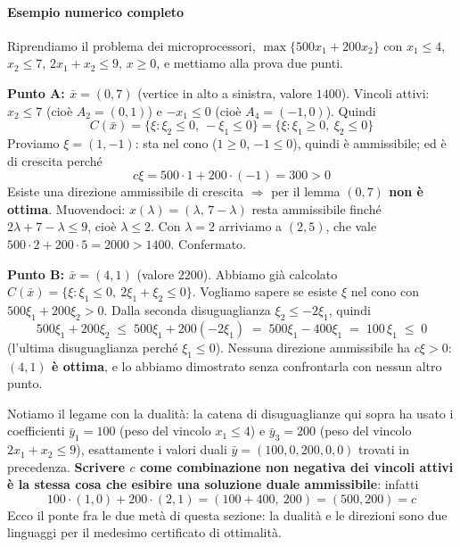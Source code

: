 \documentclass[12pt]{extarticle} %
\begin{document}
\paragraph{Esempio numerico completo}
Riprendiamo il problema dei microprocessori, $\max\{500x_1 + 200x_2\}$ con $x_1\le4$, $x_2\le7$, $2x_1+x_2\le9$, $x\ge0$, e mettiamo alla prova due punti.

\medskip
\noindent\textbf{Punto A: $\bar{x} = (0,7)$} (vertice in alto a sinistra, valore $1400$).
Vincoli attivi: $x_2 \le 7$ (cioè $A_2 = (0,1)$) e $-x_1 \le 0$ (cioè $A_4 = (-1,0)$). Quindi
\[
C(\bar{x}) = \{\xi : \xi_2 \le 0,\ -\xi_1 \le 0\} = \{\xi : \xi_1 \ge 0,\ \xi_2 \le 0\}
\]
Proviamo $\xi = (1,-1)$: sta nel cono ($1\ge0$, $-1\le0$), quindi è ammissibile; ed è di crescita perché
\[
c\xi = 500\cdot 1 + 200\cdot(-1) = 300 > 0
\]
Esiste una direzione ammissibile di crescita $\Rightarrow$ per il lemma \textbf{$(0,7)$ non è ottima}. Muovendoci: $x(\lambda) = (\lambda,\,7-\lambda)$ resta ammissibile finché $2\lambda + 7 - \lambda \le 9$, cioè $\lambda \le 2$. Con $\lambda = 2$ arriviamo a $(2,5)$, che vale $500\cdot2 + 200\cdot5 = 2000 > 1400$. Confermato.

\medskip
\noindent\textbf{Punto B: $\bar{x} = (4,1)$} (valore $2200$).
Abbiamo già calcolato $C(\bar{x}) = \{\xi : \xi_1 \le 0,\ 2\xi_1 + \xi_2 \le 0\}$. Vogliamo sapere se esiste $\xi$ nel cono con $500\xi_1 + 200\xi_2 > 0$. Dalla seconda disuguaglianza $\xi_2 \le -2\xi_1$, quindi
\[
500\xi_1 + 200\xi_2 \;\le\; 500\xi_1 + 200(-2\xi_1) \;=\; 500\xi_1 - 400\xi_1 \;=\; 100\,\xi_1 \;\le\; 0
\]
(l'ultima disuguaglianza perché $\xi_1 \le 0$). Nessuna direzione ammissibile ha $c\xi > 0$: \textbf{$(4,1)$ è ottima}, e lo abbiamo dimostrato senza confrontarla con nessun altro punto.

\medskip
\noindent Notiamo il legame con la dualità: la catena di disuguaglianze qui sopra ha usato i coefficienti $\bar{y}_1 = 100$ (peso del vincolo $x_1\le4$) e $\bar{y}_3 = 200$ (peso del vincolo $2x_1+x_2\le9$), esattamente i valori duali $\bar{y} = (100,0,200,0,0)$ trovati in precedenza. \textbf{Scrivere $c$ come combinazione non negativa dei vincoli attivi è la stessa cosa che esibire una soluzione duale ammissibile}: infatti
\[
100\cdot(1,0) + 200\cdot(2,1) = (100 + 400,\ 200) = (500,200) = c
\]
Ecco il ponte fra le due metà di questa sezione: la dualità e le direzioni sono due linguaggi per il medesimo certificato di ottimalità.
\end{document}
